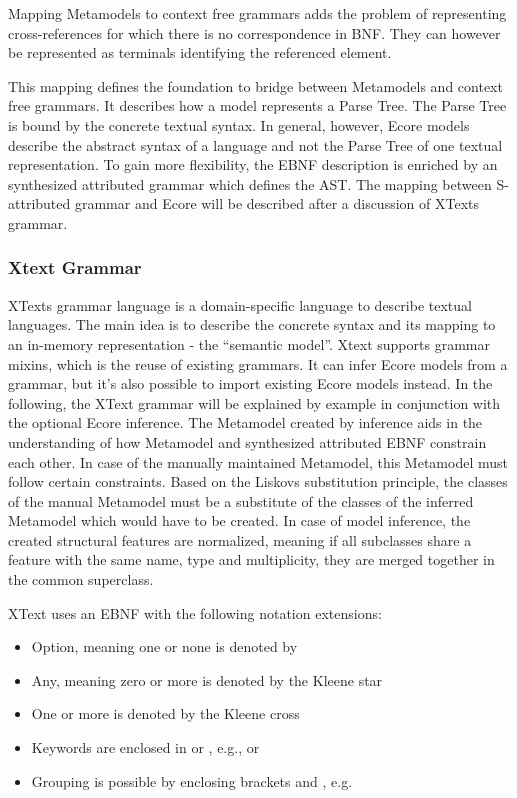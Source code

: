 Mapping Metamodels to context free grammars adds the problem of representing cross-references for which there is no correspondence in BNF. They can however be represented as terminals identifying the referenced element.   

This mapping defines the foundation to bridge between Metamodels and context free grammars. It describes how a model represents a Parse Tree. The Parse Tree is bound by the concrete textual syntax. In general, however, Ecore models describe the abstract syntax of a language and not the Parse Tree of one textual representation. To gain more flexibility, the EBNF description is enriched by an synthesized attributed grammar which defines the AST. The mapping between S-attributed grammar and Ecore will be described after a discussion of XTexts grammar.


\subsubsection{Xtext Grammar}
XTexts grammar language is a domain-specific language to describe textual languages. The main idea is to describe the concrete syntax and its mapping to an in-memory representation - the ``semantic model''. Xtext supports grammar mixins, which is the reuse of existing grammars. It can infer Ecore models from a grammar, but it's also possible to import existing Ecore models instead. In the following, the XText grammar will be explained by example in conjunction with the optional Ecore inference. The Metamodel created by inference aids in the understanding of how Metamodel and synthesized attributed EBNF constrain each other. In case of the manually maintained Metamodel, this Metamodel must follow certain constraints. Based on the Liskovs substitution principle, the classes of the manual Metamodel must be a substitute of the classes of the inferred Metamodel which would have to be created. In case of model inference, the created structural features are normalized, meaning if all subclasses share a feature with the same name, type and multiplicity, they are merged together in the common superclass.

XText uses an EBNF with the following notation extensions:
\begin{itemize}
	\item Option, meaning one or none is denoted by 
	\item Any, meaning zero or more is denoted by the Kleene star \code{*}
	\item One or more is denoted by the Kleene cross \code{+}
	\item Keywords are enclosed in  or , e.g.,  or 
	\item Grouping is possible by enclosing brackets \code{(} and  \code{)}, e.g. 
\end{itemize}

